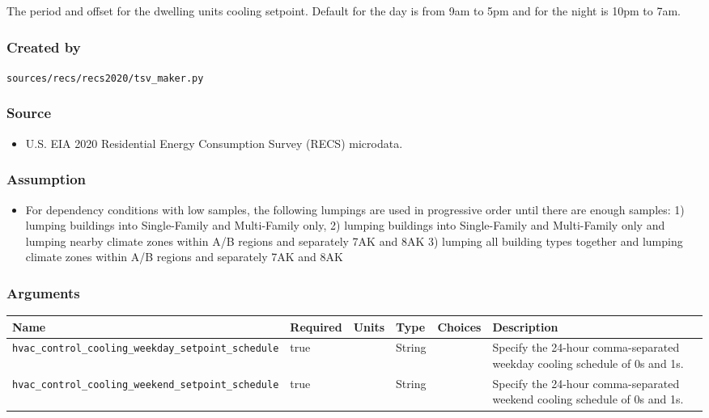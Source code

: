 The period and offset for the dwelling unit\textquotesingle s cooling
setpoint. Default for the day is from 9am to 5pm and for the night is
10pm to 7am.

\subsubsection{Created by}\label{created-by-25}

\texttt{sources/recs/recs2020/tsv\_maker.py}

\subsubsection{Source}\label{source-25}

\begin{itemize}
 
\item
  U.S. EIA 2020 Residential Energy Consumption Survey (RECS) microdata.
\end{itemize}

\subsubsection{Assumption}\label{assumption-16}

\begin{itemize}
 
\item
  For dependency conditions with low samples, the following lumpings are
  used in progressive order until there are enough samples: 1) lumping
  buildings into Single-Family and Multi-Family only, 2) lumping
  buildings into Single-Family and Multi-Family only and lumping nearby
  climate zones within A/B regions and separately 7AK and 8AK 3) lumping
  all building types together and lumping climate zones within A/B
  regions and separately 7AK and 8AK
\end{itemize}

\subsubsection{Arguments}\label{arguments-15}

\begin{longtable}[]{@{}llllll@{}}
\toprule\noalign{}
Name & Required & Units & Type & Choices & Description \\
\midrule\noalign{}
\endhead
\bottomrule\noalign{}
\endlastfoot
\texttt{hvac\_control\_cooling\_weekday\_setpoint\_schedule} & true & &
String & & Specify the 24-hour comma-separated weekday cooling schedule
of 0s and 1s. \\
\texttt{hvac\_control\_cooling\_weekend\_setpoint\_schedule} & true & &
String & & Specify the 24-hour comma-separated weekend cooling schedule
of 0s and 1s. \\
\end{longtable}

